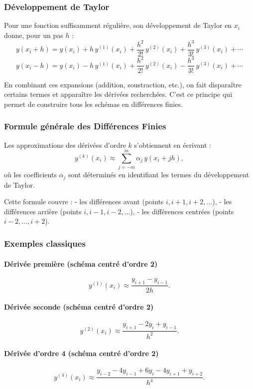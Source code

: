 \documentclass[12pt, a4paper]{article}
\begin{document}
\subsubsection{Développement de Taylor}

Pour une fonction suffisamment régulière, son développement de Taylor en $x_i$
donne, pour un pas $h$ :
\[
y(x_i + h)
  = y(x_i)
  + h\,y^{(1)}(x_i)
  + \frac{h^2}{2!}\,y^{(2)}(x_i)
  + \frac{h^3}{3!}\,y^{(3)}(x_i)
  + \cdots
\]
\[
y(x_i - h)
  = y(x_i)
  - h\,y^{(1)}(x_i)
  + \frac{h^2}{2!}\,y^{(2)}(x_i)
  - \frac{h^3}{3!}\,y^{(3)}(x_i)
  + \cdots
\]

En combinant ces expansions (addition, soustraction, etc.), on fait disparaître 
certains termes et apparaître les dérivées recherchées.  
C’est ce principe qui permet de construire tous les schémas en différences finies.

\subsubsection{Formule générale des Différences Finies}

Les approximations des dérivées d’ordre $k$ s’obtiennent en écrivant :
\[
y^{(k)}(x_i)
\approx
\sum_{j=-m}^{m} \alpha_j\, y(x_i + jh),
\]
où les coefficients $\alpha_j$ sont déterminés en identifiant les termes du développement de Taylor.

Cette formule couvre :
- les différences avant (points $i, i+1, i+2,\dots$),  
- les différences arrière (points $i, i-1, i-2,\dots$),  
- les différences centrées (points $i-2,\dots,i+2$).

\subsubsection{Exemples classiques}

\paragraph{Dérivée première (schéma centré d’ordre 2)}
\[
y^{(1)}(x_i) \approx \frac{y_{i+1} - y_{i-1}}{2h}.
\]

\paragraph{Dérivée seconde (schéma centré d’ordre 2)}
\[
y^{(2)}(x_i) 
\approx 
\frac{y_{i+1} - 2y_i + y_{i-1}}{h^2}.
\]

\paragraph{Dérivée d’ordre 4 (schéma centré d’ordre 2)}
\[
y^{(4)}(x_i)
\approx
\frac{y_{i-2} - 4y_{i-1} + 6y_i - 4y_{i+1} + y_{i+2}}{h^4}.
\]
\end{document}
